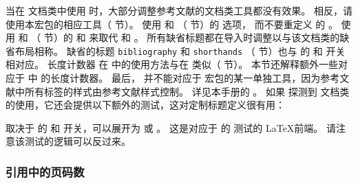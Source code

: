 当在  文档类中使用 \biblatex 时，大部分调整参考文献的文档类工具都没有效果。
相反，请使用本宏包的相应工具（ 节）。
使用  和 （ 节）的  选项，
而不要重定义  的 。
使用  和 （ 节）的  和  来取代  和 。
所有缺省标题都在导入时调整以与该文档类的缺省布局相称。
缺省的标题 \texttt{bibliography} 和 \texttt{shorthands} （ 节）也与  的  和  开关相对应。
长度计数器  在 \biblatex 中的使用方法与在  类似（ 节）。
本节还解释额外一些对应于  中  的长度计数器。
最后， 并不能对应于 \biblatex 宏包的某一单独工具，因为参考文献中所有标签的样式由参考文献样式控制。
详见本手册的 。
如果 \biblatex 探测到  文档类的使用，它还会提供以下额外的测试，这对定制标题定义很有用：

\begin{ltxsyntax}



取决于  的  和  开关，可以展开为  或 。
这是对应于  的  测试的 \LaTeX 前端。
请注意该测试的逻辑可以反过来。

\end{ltxsyntax}

\subsubsection{引用中的页码数}%
\label{use:cav:pag}

